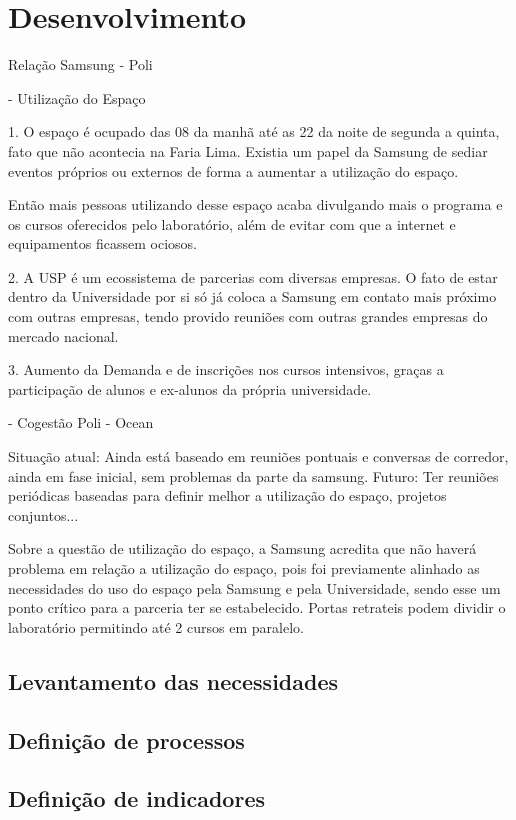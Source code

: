 \chapter{Desenvolvimento}
\label{cha:desenvolvimento}
Relação Samsung - Poli

- Utilização do Espaço

1. O espaço é ocupado das 08 da manhã até as 22 da noite de segunda a quinta, fato que não acontecia na Faria Lima. Existia um papel da Samsung de sediar eventos próprios ou externos de forma a aumentar a utilização do espaço. 

Então mais pessoas utilizando desse espaço acaba divulgando mais o programa e os cursos oferecidos pelo laboratório, além de evitar com que a internet e equipamentos ficassem ociosos.

2. A USP é um ecossistema de parcerias com diversas empresas. O fato de estar dentro da Universidade por si só já coloca a Samsung em contato mais próximo com outras empresas, tendo provido reuniões com outras grandes empresas do mercado nacional.

3. Aumento da Demanda e de inscrições nos cursos intensivos, graças a participação de alunos e ex-alunos da própria universidade. 

- Cogestão Poli - Ocean

Situação atual: Ainda está baseado em reuniões pontuais e conversas de corredor, ainda em fase inicial, sem problemas da parte da samsung.
Futuro: Ter reuniões periódicas baseadas para definir melhor a utilização do espaço, projetos conjuntos...

Sobre a questão de utilização do espaço, a Samsung acredita que não haverá problema em relação a utilização do espaço, pois foi previamente alinhado as necessidades do uso do espaço pela Samsung e pela Universidade, sendo esse um ponto crítico para a parceria ter se estabelecido. Portas retrateis podem dividir o laboratório permitindo até 2 cursos em paralelo. 

\section{Levantamento das necessidades} %
\label{sec:necessidades}

\section{Definição de processos} %
\label{sec:processos}

\section{Definição de indicadores} %
\label{sec:indicadores}